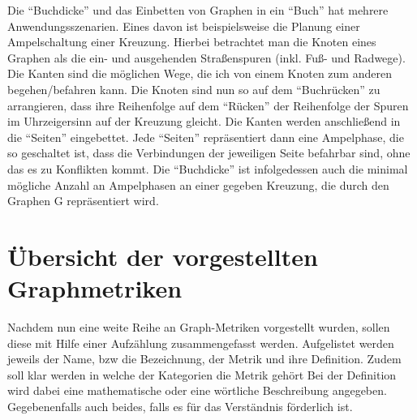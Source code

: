 \documentclass[a4paper,12pt,ngerman,chapterprefix=false,listof=totoc,bibliography=totoc]{scrreprt}
\begin{document}
{{Die "`Buchdicke"' und das Einbetten von Graphen in ein "`Buch"' hat mehrere Anwendungsszenarien. Eines davon ist beispielsweise die Planung einer Ampelschaltung einer Kreuzung. Hierbei betrachtet man die Knoten eines Graphen als die ein- und ausgehenden Straßenspuren (inkl. Fuß- und Radwege). Die Kanten sind die möglichen Wege, die ich von einem Knoten zum anderen begehen/befahren kann. Die Knoten sind nun so auf dem "`Buchrücken"' zu arrangieren, dass ihre Reihenfolge auf dem "`Rücken"' der Reihenfolge der Spuren im Uhrzeigersinn auf der Kreuzung gleicht. Die Kanten werden anschließend in die "`Seiten"' eingebettet. Jede "`Seiten"' repräsentiert dann eine Ampelphase, die so geschaltet ist, dass die Verbindungen der jeweiligen Seite befahrbar sind, ohne das es zu Konflikten kommt. Die "`Buchdicke"' ist infolgedessen auch die minimal mögliche Anzahl an Ampelphasen an einer gegeben Kreuzung, die durch den Graphen G repräsentiert wird. \cite{kainen_book_1990}
}
\section{Übersicht der vorgestellten Graphmetriken}
{
Nachdem nun eine weite Reihe an Graph-Metriken vorgestellt wurden, sollen diese mit Hilfe einer Aufzählung zusammengefasst werden. Aufgelistet werden jeweils der Name, bzw die Bezeichnung, der Metrik und ihre Definition. Zudem soll klar werden in welche der Kategorien die Metrik gehört Bei der Definition wird dabei eine mathematische oder eine wörtliche Beschreibung angegeben. Gegebenenfalls auch beides, falls es für das Verständnis förderlich ist.

}}
\end{document}
